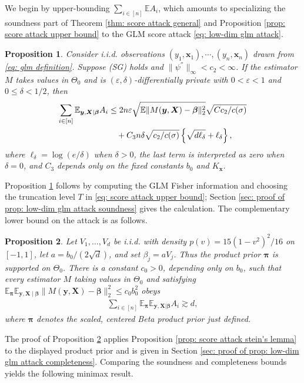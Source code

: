 \documentclass[letterpaper,12pt]{article}
\numberwithin{equation}{section}
\theoremstyle{plain}
\numberwithin{Theorem}{section}
\newtheorem{proposition}{Proposition}
\numberwithin{proposition}{section}
\numberwithin{Lemma}{section}
{
	\theoremstyle{definition}
	\newtheorem{Definition}{Definition}
	\newtheorem{example}{Example}
	\numberwithin{example}{section}
	\newtheorem{fact}{Fact}
	\numberwithin{fact}{section}
	\newtheorem{remark}{Remark}
}
\newcommand{\rev}[1]{#1}
\newcommand{\1}{\mathbbm{1}}
\def\bbeta{{\boldsymbol{\beta}}}
\def\E{\mathbb{E}}
\begin{document}
We begin by upper-bounding $\sum_{i \in [n]} \E A_i$, which amounts to specializing the soundness part of Theorem \ref{thm: score attack general} and Proposition \ref{prop: score attack upper bound} to the GLM score attack \eqref{eq: low-dim glm attack}. 
\begin{proposition}\label{prop: low-dim glm attack soundness}
			Consider i.i.d. observations $(y_1, \bm x_1), \cdots, (y_n, \bm x_n)$ drawn from \eqref{eq: glm definition}. Suppose (SG) holds and $\|\psi^{''}\|_\infty < c_2 < \infty$. If the estimator $M$ takes values in $\Theta_0$ and is $(\varepsilon, \delta)$-differentially private with $0 < \varepsilon < 1$ and $0\leq\delta<1/2$, then
		\begin{align}\label{eq: low-dim glm attack soundness}
			\sum_{i \in [n]} \E_{\bm y, \bm X|\bbeta} A_i
			&\leq 2n\varepsilon\sqrt{\E\|M(\bm y, \bm X) - \bbeta\|^2_2}
			\sqrt{Cc_2/c(\sigma)} \notag\\
			&\quad+C_3n\delta\sqrt{c_2/c(\sigma)}
			\left\{\sqrt{d\ell_\delta}+\ell_\delta\right\},
		\end{align}
		where $\ell_\delta=\log(e/\delta)$ when $\delta>0$, the last term is interpreted as zero when $\delta=0$, and $C_3$ depends only on the fixed constants $b_0$ and $K_{\bm x}$.
\end{proposition}
Proposition \ref{prop: low-dim glm attack soundness} follows by computing the GLM Fisher information and choosing the truncation level $T$ in \eqref{eq: score attack upper bound}; Section \ref{sec: proof of prop: low-dim glm attack soundness} gives the calculation.  The complementary lower bound on the attack is as follows.

\begin{proposition}\label{prop: low-dim glm attack completeness}
		\rev{Let $V_1,\ldots,V_d$ be i.i.d. with density $p(v)=15(1-v^2)^2/16$ on $[-1,1]$, let $a=b_0/(2\sqrt d)$, and set $\beta_j=aV_j$. Thus the product prior $\bm\pi$ is supported on $\Theta_0$. There is a constant $c_0>0$, depending only on $b_0$, such that every estimator $M$ taking values in $\Theta_0$ and satisfying $\E_{\bm\pi}\E_{\bm y,\bm X\mid\bbeta}\|M(\bm y,\bm X)-\bbeta\|_2^2\leq c_0b_0^2$ obeys}
	\begin{align}\label{eq: low-dim glm attack completeness}
		\sum_{i \in [n]} \E_{\bm \pi}\E_{\bm y, \bm X|\bbeta} A_i \gtrsim d, 
	\end{align}
\rev{where $\bm \pi$ denotes the scaled, centered Beta product prior just defined.}
\end{proposition}
The proof of Proposition \ref{prop: low-dim glm attack completeness} applies Proposition \ref{prop: score attack stein's lemma} to the displayed product prior and is given in Section \ref{sec: proof of prop: low-dim glm attack completeness}.  Comparing the soundness and completeness bounds yields the following minimax result.
\end{document}
